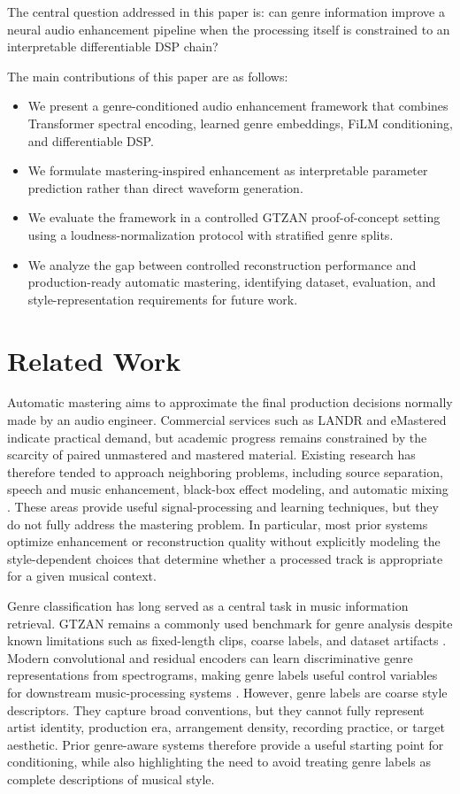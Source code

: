 \documentclass[journal]{IEEEtran}
\begin{document}
The central question addressed in this paper is: can genre information improve a neural audio enhancement pipeline when the processing itself is constrained to an interpretable differentiable DSP chain?

The main contributions of this paper are as follows:
\begin{itemize}
\item We present a genre-conditioned audio enhancement framework that combines Transformer spectral encoding, learned genre embeddings, FiLM conditioning, and differentiable DSP.
\item We formulate mastering-inspired enhancement as interpretable parameter prediction rather than direct waveform generation.
\item We evaluate the framework in a controlled GTZAN proof-of-concept setting using a loudness-normalization protocol with stratified genre splits.
\item We analyze the gap between controlled reconstruction performance and production-ready automatic mastering, identifying dataset, evaluation, and style-representation requirements for future work.
\end{itemize}

\section{Related Work}
Automatic mastering aims to approximate the final production decisions normally made by an audio engineer. Commercial services such as LANDR and eMastered indicate practical demand, but academic progress remains constrained by the scarcity of paired unmastered and mastered material. Existing research has therefore tended to approach neighboring problems, including source separation, speech and music enhancement, black-box effect modeling, and automatic mixing \cite{defossez2021real,mack2020deep,steinmetz2021automatic,colonartificial}. These areas provide useful signal-processing and learning techniques, but they do not fully address the mastering problem. In particular, most prior systems optimize enhancement or reconstruction quality without explicitly modeling the style-dependent choices that determine whether a processed track is appropriate for a given musical context.

Genre classification has long served as a central task in music information retrieval. GTZAN remains a commonly used benchmark for genre analysis despite known limitations such as fixed-length clips, coarse labels, and dataset artifacts \cite{tzanetakis2002musical}. Modern convolutional and residual encoders can learn discriminative genre representations from spectrograms, making genre labels useful control variables for downstream music-processing systems \cite{he2016deep,gururani2019instrument}. However, genre labels are coarse style descriptors. They capture broad conventions, but they cannot fully represent artist identity, production era, arrangement density, recording practice, or target aesthetic. Prior genre-aware systems therefore provide a useful starting point for conditioning, while also highlighting the need to avoid treating genre labels as complete descriptions of musical style.
\end{document}
